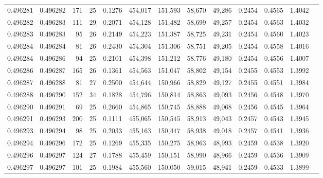 \begin{tabular}{rrrrrrrrrrrrr}
0.496281 & 0.496282 & 171 &  25 &                                     0.1276 & 454,017 & 151,593 &  58,670 &  49,286 & 0.2454 & 0.4565 & 1.4042 \\
0.496282 & 0.496283 & 111 &  29 &                                     0.2071 & 454,128 & 151,482 &  58,699 &  49,257 & 0.2454 & 0.4563 & 1.4032 \\
0.496283 & 0.496283 &  95 &  26 &                                     0.2149 & 454,223 & 151,387 &  58,725 &  49,231 & 0.2454 & 0.4560 & 1.4023 \\
0.496284 & 0.496284 &  81 &  26 &                                     0.2430 & 454,304 & 151,306 &  58,751 &  49,205 & 0.2454 & 0.4558 & 1.4016 \\
0.496284 & 0.496286 &  94 &  25 &                                     0.2101 & 454,398 & 151,212 &  58,776 &  49,180 & 0.2454 & 0.4556 & 1.4007 \\
0.496286 & 0.496287 & 165 &  26 &                                     0.1361 & 454,563 & 151,047 &  58,802 &  49,154 & 0.2455 & 0.4553 & 1.3992 \\
0.496287 & 0.496288 &  81 &  27 &                                     0.2500 & 454,644 & 150,966 &  58,829 &  49,127 & 0.2455 & 0.4551 & 1.3984 \\
0.496288 & 0.496290 & 152 &  34 &                                     0.1828 & 454,796 & 150,814 &  58,863 &  49,093 & 0.2456 & 0.4548 & 1.3970 \\
0.496290 & 0.496291 &  69 &  25 &                                     0.2660 & 454,865 & 150,745 &  58,888 &  49,068 & 0.2456 & 0.4545 & 1.3964 \\
0.496291 & 0.496293 & 200 &  25 &                                     0.1111 & 455,065 & 150,545 &  58,913 &  49,043 & 0.2457 & 0.4543 & 1.3945 \\
0.496293 & 0.496294 &  98 &  25 &                                     0.2033 & 455,163 & 150,447 &  58,938 &  49,018 & 0.2457 & 0.4541 & 1.3936 \\
0.496294 & 0.496296 & 172 &  25 &                                     0.1269 & 455,335 & 150,275 &  58,963 &  48,993 & 0.2459 & 0.4538 & 1.3920 \\
0.496296 & 0.496297 & 124 &  27 &                                     0.1788 & 455,459 & 150,151 &  58,990 &  48,966 & 0.2459 & 0.4536 & 1.3909 \\
0.496297 & 0.496297 & 101 &  25 &                                     0.1984 & 455,560 & 150,050 &  59,015 &  48,941 & 0.2459 & 0.4533 & 1.3899 \\

\end{tabular}
